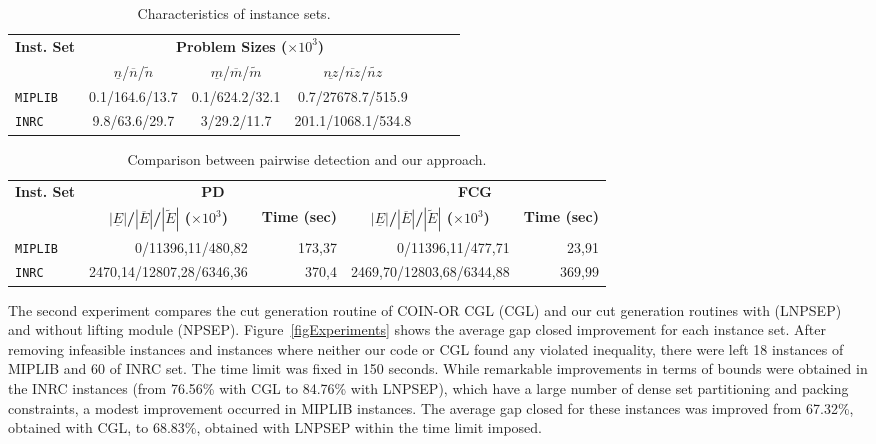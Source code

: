 \documentclass{endm}
\begin{document}
\begin{table}[htbp]
\scriptsize
\caption{Characteristics of instance sets.}
\begin{center}
\begin{tabular}{|l|c|c|c|c|r|r|}
\hline 
\multirow{2}{0.8cm}{\textbf{Inst. Set}} & \multicolumn{3}{c|}{{\textbf{Problem Sizes ($\times10^{3}$)}}} \tabularnewline
\cline{2-4} 
 & {$\underline{n}$/$\overline{n}$/$\tilde{n}$} & {$\underline{m}$/$\overline{m}$/$\tilde{m}$} & {$\underline{nz}$/$\overline{nz}$/$\tilde{nz}$} \tabularnewline
\hline 
\hline 
\texttt{MIPLIB} & {0.1/164.6/13.7} & {0.1/624.2/32.1} & {0.7/27678.7/515.9}\tabularnewline
\hline 
\texttt{INRC} & {9.8/63.6/29.7} & {3/29.2/11.7} & {201.1/1068.1/534.8}\tabularnewline
\hline 
\end{tabular}
\end{center}
\label{tab:inst}
\end{table}

\begin{table}[htbp]
\scriptsize
\caption{Comparison between pairwise detection and our approach.}
\begin{center}
\begin{tabular}{|l|r|r|r|r|}
\hline
\multirow{2}{0.8cm}{\textbf{Inst. Set}} & \multicolumn{ 2}{c|}{\textbf{PD}} & \multicolumn{ 2}{c|}{\textbf{FCG}} \\ \cline{ 2- 5}
\multicolumn{ 1}{|c|}{} & \multicolumn{1}{c|}{\textbf{$|\underline{E}|$/$|\overline{E}|$/$|\tilde{E}|$ ($\times10^{3}$)}} & \multicolumn{1}{c|}{\textbf{Time (sec)}} & \multicolumn{1}{c|}{\textbf{$|\underline{E}|$/$|\overline{E}|$/$|\tilde{E}|$ ($\times10^{3}$)}} & \multicolumn{1}{c|}{\textbf{Time (sec)}} \\ \hline
\texttt{MIPLIB} & 0/11396,11/480,82 & 173,37 & 0/11396,11/477,71 & 23,91 \\ \hline
\texttt{INRC} & 2470,14/12807,28/6346,36 & 370,4 & 2469,70/12803,68/6344,88 & 369,99 \\ \hline
\end{tabular}
\end{center}
\label{tab:graph}
\end{table}

The second experiment compares the cut generation routine of COIN-OR CGL (CGL) and our cut generation routines with (LNPSEP) and without lifting module (NPSEP). Figure~\ref{figExperiments} shows the average gap closed improvement for each instance set. After removing infeasible instances and instances where neither our code or CGL found any violated inequality, there were left 18 instances of MIPLIB and 60 of INRC set. The time limit was fixed in 150 seconds. While remarkable improvements in terms of bounds were obtained in the INRC instances (from 76.56\% with CGL to 84.76\% with LNPSEP), which have a large number of dense set partitioning and packing constraints, a modest improvement occurred in MIPLIB instances. The average gap closed for these instances was improved from 67.32\%, obtained with CGL, to 68.83\%, obtained with LNPSEP within the time limit imposed. 
\end{document}

